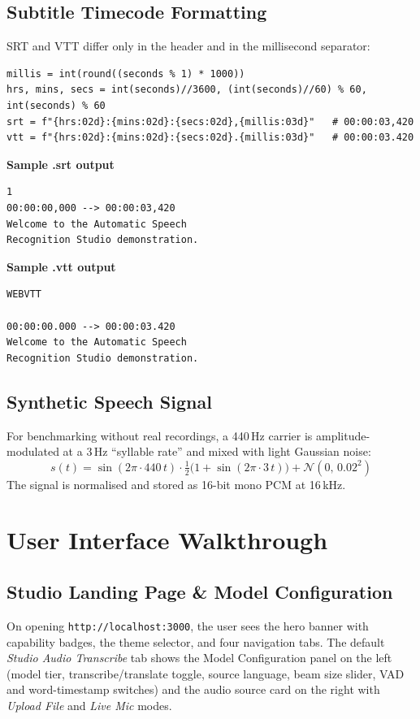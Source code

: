 \documentclass[11pt,a4paper]{article}
\begin{document}
\subsection{Subtitle Timecode Formatting}
SRT and VTT differ only in the header and in the millisecond separator:
\begin{lstlisting}[style=py]
millis = int(round((seconds % 1) * 1000))
hrs, mins, secs = int(seconds)//3600, (int(seconds)//60) % 60, int(seconds) % 60
srt = f"{hrs:02d}:{mins:02d}:{secs:02d},{millis:03d}"   # 00:00:03,420
vtt = f"{hrs:02d}:{mins:02d}:{secs:02d}.{millis:03d}"   # 00:00:03.420
\end{lstlisting}

\begin{minipage}[t]{0.48\textwidth}
\textbf{Sample .srt output}
\begin{lstlisting}[style=base]
1
00:00:00,000 --> 00:00:03,420
Welcome to the Automatic Speech
Recognition Studio demonstration.
\end{lstlisting}
\end{minipage}\hfill
\begin{minipage}[t]{0.48\textwidth}
\textbf{Sample .vtt output}
\begin{lstlisting}[style=base]
WEBVTT

00:00:00.000 --> 00:00:03.420
Welcome to the Automatic Speech
Recognition Studio demonstration.
\end{lstlisting}
\end{minipage}

\subsection{Synthetic Speech Signal}
For benchmarking without real recordings, a 440\,Hz carrier is amplitude-modulated at a 3\,Hz ``syllable rate'' and mixed with light Gaussian noise:
\[
s(t) = \sin(2\pi \cdot 440\,t)\cdot \tfrac{1}{2}\bigl(1+\sin(2\pi \cdot 3\,t)\bigr) + \mathcal{N}(0,\,0.02^2)
\]
The signal is normalised and stored as 16-bit mono PCM at 16\,kHz.

\clearpage
\section{User Interface Walkthrough}
\subsection{Studio Landing Page \& Model Configuration}
On opening \texttt{http://localhost:3000}, the user sees the hero banner with capability badges, the theme selector, and four navigation tabs. The default \emph{Studio Audio Transcribe} tab shows the Model Configuration panel on the left (model tier, transcribe/translate toggle, source language, beam size slider, VAD and word-timestamp switches) and the audio source card on the right with \emph{Upload File} and \emph{Live Mic} modes.
\end{document}
